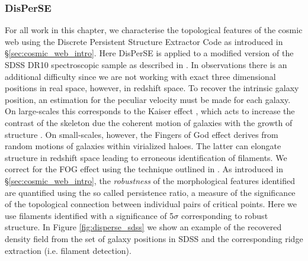 \subsubsection{DisPerSE}
For all work in this chapter, we characterise the topological features of the cosmic web using the Discrete Persistent Structure Extractor Code \citep{sousbie2011a, sousbie2011b} as introduced in \S\ref{sec:cosmic_web_intro}. Here DisPerSE is applied to a modified version of the SDSS DR10 spectroscopic sample as described in \citet{tempel2014}. In observations there is an additional difficulty since we are not working with exact three dimensional positions in real space, however, in redshift space. To recover the intrinsic galaxy position, an estimation for the peculiar velocity must be made for each galaxy. On large-scales this corresponds to the Kaiser effect \citep{kaiser1987}, which acts to increase the contrast of the skeleton due the coherent motion of galaxies with the growth of structure \citep[e.g.][]{shi2016}. On small-scales, however, the Fingers of God effect \citep[FOG;][]{jackson1972,tulley1978} derives from random motions of galaxies within virialized haloes. The latter can elongate structure in redshift space leading to erroneous identification of filaments. We correct for the FOG effect using the technique outlined in \citet{kraljic2018}. As introduced in \S\ref{sec:cosmic_web_intro}, the \textit{robustness} of the morphological features identified are quantified using the so called persistence ratio, a measure of the significance of the topological connection between individual pairs of critical points. Here we use filaments identified with a significance of 5$\sigma$ corresponding to robust structure. In Figure \ref{fig:disperse_sdss} we show an example of the recovered density field from the set of galaxy positions in SDSS and the corresponding ridge extraction (i.e. filament detection). 

